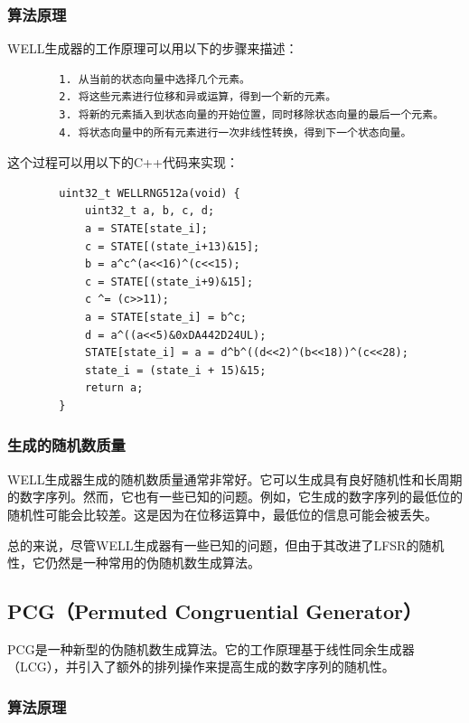 \documentclass{ctexart}
\begin{document}
        \subsubsection{算法原理}

        WELL生成器的工作原理可以用以下的步骤来描述：

        \begin{lstlisting}
        1. 从当前的状态向量中选择几个元素。
        2. 将这些元素进行位移和异或运算，得到一个新的元素。
        3. 将新的元素插入到状态向量的开始位置，同时移除状态向量的最后一个元素。
        4. 将状态向量中的所有元素进行一次非线性转换，得到下一个状态向量。
        \end{lstlisting}

        这个过程可以用以下的C++代码来实现：

        \begin{lstlisting}
        uint32_t WELLRNG512a(void) {
            uint32_t a, b, c, d;
            a = STATE[state_i];
            c = STATE[(state_i+13)&15];
            b = a^c^(a<<16)^(c<<15);
            c = STATE[(state_i+9)&15];
            c ^= (c>>11);
            a = STATE[state_i] = b^c;
            d = a^((a<<5)&0xDA442D24UL);
            STATE[state_i] = a = d^b^((d<<2)^(b<<18))^(c<<28);
            state_i = (state_i + 15)&15;
            return a;
        }
        \end{lstlisting}

        \subsubsection{生成的随机数质量}

        WELL生成器生成的随机数质量通常非常好。它可以生成具有良好随机性和长周期的数字序列。然而，它也有一些已知的问题。例如，它生成的数字序列的最低位的随机性可能会比较差。这是因为在位移运算中，最低位的信息可能会被丢失。

        总的来说，尽管WELL生成器有一些已知的问题，但由于其改进了LFSR的随机性，它仍然是一种常用的伪随机数生成算法。
    \subsection{PCG（Permuted Congruential Generator）}

    PCG是一种新型的伪随机数生成算法。它的工作原理基于线性同余生成器（LCG），并引入了额外的排列操作来提高生成的数字序列的随机性。

    \subsubsection{算法原理}
\end{document}
